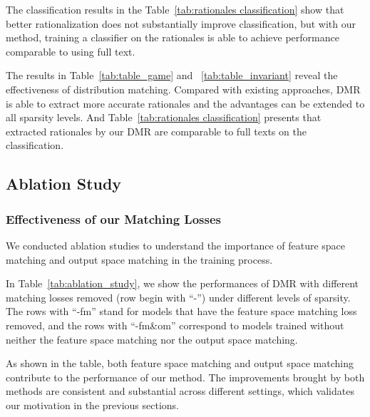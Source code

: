 \documentclass[letterpaper]{article} %
\begin{document}
The classification results in the Table~\ref{tab:rationales classification} show that better rationalization does not substantially improve classification, but with our method, training a classifier on the rationales is able to achieve performance comparable to using full text. 

The results in Table~\ref{tab:table_game} and ~\ref{tab:table_invariant} reveal the effectiveness of distribution matching.  Compared with existing approaches, DMR is able to extract more accurate rationales and the advantages can be extended to all sparsity levels. And Table~\ref{tab:rationales classification} presents that extracted rationales by our DMR are comparable to full texts on the classification. 






\subsection{Ablation Study}
\subsubsection{Effectiveness of our Matching Losses}
We conducted ablation studies to understand the importance of feature space matching and output space matching in the training process. 


In Table~\ref{tab:ablation_study}, we show the performances of DMR with different matching losses removed (row begin with ``-'') under different levels of sparsity. The rows with ``-fm'' stand for models that have the feature space matching loss removed, and the rows with ``-fm\&om'' correspond to models trained without neither the feature space matching nor the output space matching. 

As shown in the table, both feature space matching and output space matching contribute to the performance of our method. The improvements brought by both methods are consistent and substantial across different settings, which validates our motivation in the previous sections.
\end{document}
